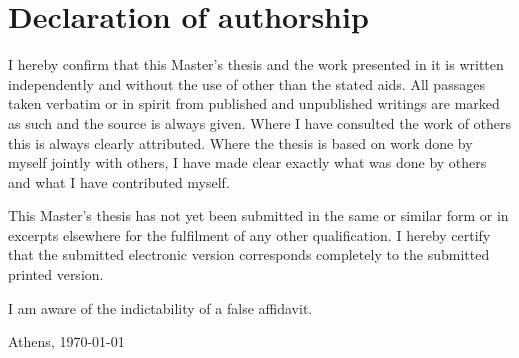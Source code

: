 \chapter*{Declaration of authorship}

I hereby confirm that this Master's thesis and the work presented in it is written independently and without the use of other than the stated aids.
All passages taken verbatim or in spirit from published and unpublished writings are marked as such and the source is always given. 
Where I have consulted the work of others this is always clearly attributed.
Where the thesis is based on work done by myself jointly with others, I have made clear exactly what was done by others and what I have contributed myself.
\vspace{1cm}

\noindent
This Master's thesis has not yet been submitted in the same or similar form or in excerpts elsewhere for the fulfilment of any other qualification.
I hereby certify that the submitted electronic version corresponds completely to the submitted printed version.

\vspace{1cm}

\noindent
I am aware of the indictability of a false affidavit.

\vspace{3cm}
\noindent

Athens, \today
